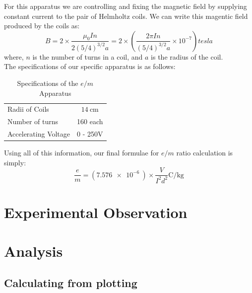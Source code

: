 \documentclass[../main.tex]{subfiles}
\begin{document}
For this apparatus we are controlling and fixing the magnetic field by supplying constant current to the pair of Helmholtz coils. We can write this magentic field produced by the coils as:
$$ B = 2\times\frac{\mu_0In}{2 (5/4)^{3/2} a} = 2 \times \left( \frac{2\pi I n}{(5/4)^{3/2}a} \times 10^{-7}\right) \si{tesla} $$
where, $n$ is the number of turns in a coil, and $a$ is the radius of the coil. \\
The specifications of our specific apparatus is as follows:
\begin{table}[H]
	\centering
	\begin{tabular}{lc}
		\toprule
		Radii of Coils & $\SI{14}{\centi\meter}$ \\
		Number of turns & 160 each \\
		Accelerating Voltage & 0 - 250$\si{\volt}$ \\
		\bottomrule
	\end{tabular}
	\caption{Specifications of the $e/m$ Apparatus}
	\label{tab:spec}
\end{table}

Using all of this information, our final formulae for $e/m$ ratio calculation is simply:
\begin{equation}
	\frac{e}{m} = (\SI{7.576e-6}{})\times \frac{V}{I^2 d^2} \si{\coulomb\per\kilogram}
	\label{eq:formula}
\end{equation}

\section{Experimental Observation}



\section{Analysis}
\subsection*{Calculating from plotting}
\end{document}
